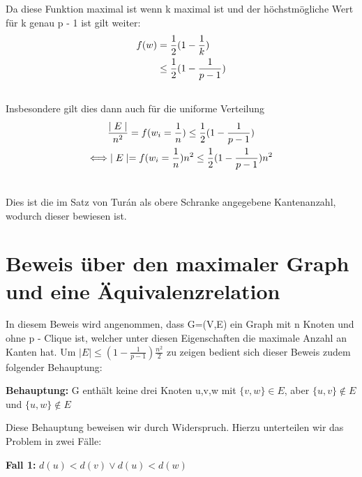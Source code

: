 \documentclass[12pt, a4paper]{article}
\begin{document}
Da diese Funktion maximal ist wenn k maximal ist und der höchstmögliche Wert für k genau p - 1 ist gilt weiter:
\begin{gather}
\begin{split}f(w) &= \frac{1}{2} (1 - \frac{1}{k}) \\
&\le \frac{1}{2} (1 - \frac{1}{p-1})\end{split}\notag\\\begin{split}\end{split}\notag
\end{gather}
Insbesondere gilt dies dann auch für die uniforme Verteilung
\begin{gather}
\begin{split}&\frac{\mid E \mid}{n^2} = f(w_i = \frac{1}{n}) \le \frac{1}{2} (1 - \frac{1}{p-1}) \\
\Longleftrightarrow &\mid E \mid = f(w_i = \frac{1}{n})  n^2 \le \frac{1}{2} (1 - \frac{1}{p-1})  n^2\end{split}\notag\\\begin{split}\end{split}\notag
\end{gather}

Dies ist die im Satz von Turán als obere Schranke angegebene Kantenanzahl, wodurch dieser bewiesen ist.

\section{Beweis über den maximaler Graph und eine Äquivalenzrelation}
\label{proof/fifth:funfter-beweis-maximaler-graph-und-aquivalenzrelation}\label{proof/fifth::doc}\label{proof/fifth:index-1}
In diesem Beweis wird angenommen, dass G=(V,E) ein Graph mit n Knoten und ohne p - Clique ist, welcher unter diesen Eigenschaften die maximale Anzahl an Kanten hat.
Um $\mid E \mid \le (1- \frac{1}{p-1}) \frac{n^2}{2}$ zu zeigen bedient sich dieser Beweis zudem folgender Behauptung:

\textbf{Behauptung:} G enthält keine drei Knoten u,v,w mit $\{ v, w \} \in E$, aber $\{ u, v \} \notin E$ und $\{ u, w \} \notin E$

Diese Behauptung beweisen wir durch Widerspruch. Hierzu unterteilen wir das Problem in zwei Fälle:

\textbf{Fall 1:} $d(u) < d(v) \vee d(u) < d(w)$
\end{document}
